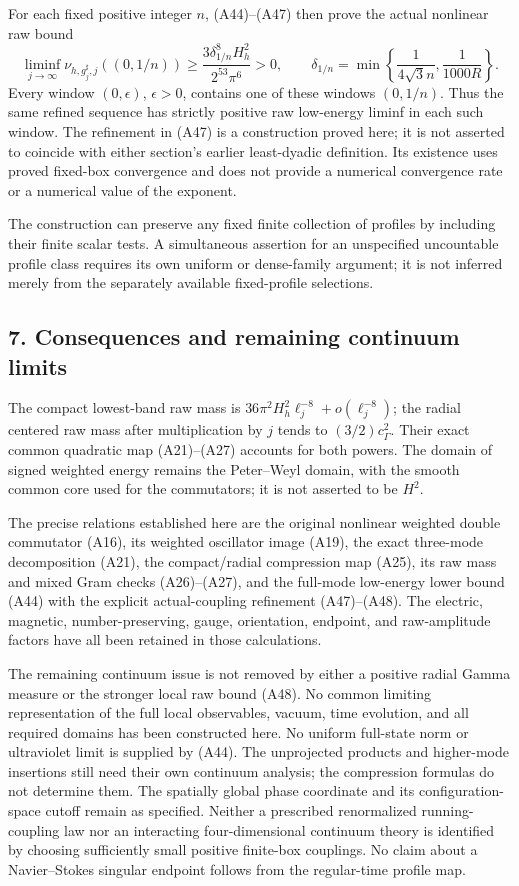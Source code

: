 \documentclass[
  11pt,
]{article}
\begin{document}
For each fixed positive integer \(n\), (A44)--(A47) then prove the
actual nonlinear raw bound \[
 \liminf_{j\to\infty}\nu_{h,g_j^{\sharp},j}((0,1/n))
 \ge\frac{3\delta_{1/n}^8H_h^2}{2^{53}\pi^6}>0,
 \qquad
 \delta_{1/n}=\min\left\{\frac1{4\sqrt3n},\frac1{1000R}\right\}.
\tag{A48}
\] Every window \((0,\epsilon)\), \(\epsilon>0\), contains one of these
windows \((0,1/n)\). Thus the same refined sequence has strictly
positive raw low-energy liminf in each such window. The refinement in
(A47) is a construction proved here; it is not asserted to coincide with
either section's earlier least-dyadic definition. Its existence uses
proved fixed-box convergence and does not provide a numerical
convergence rate or a numerical value of the exponent.

The construction can preserve any fixed finite collection of profiles by
including their finite scalar tests. A simultaneous assertion for an
unspecified uncountable profile class requires its own uniform or
dense-family argument; it is not inferred merely from the separately
available fixed-profile selections.

\subsection{7. Consequences and remaining continuum
limits}\label{weak-coupling-part-10-consequences-and-remaining-continuum-limits}

The compact lowest-band raw mass is
\(36\pi^2H_h^2\ell_j^{-8}+o(\ell_j^{-8})\); the radial centered raw mass
after multiplication by \(j\) tends to \((3/2)c_\Gamma^2\). Their exact
common quadratic map (A21)--(A27) accounts for both powers. The domain
of signed weighted energy remains the Peter--Weyl domain, with the
smooth common core used for the commutators; it is not asserted to be
\(H^2\).

The precise relations established here are the original nonlinear
weighted double commutator (A16), its weighted oscillator image (A19),
the exact three-mode decomposition (A21), the compact/radial compression
map (A25), its raw mass and mixed Gram checks (A26)--(A27), and the
full-mode low-energy lower bound (A44) with the explicit actual-coupling
refinement (A47)--(A48). The electric, magnetic, number-preserving,
gauge, orientation, endpoint, and raw-amplitude factors have all been
retained in those calculations.

The remaining continuum issue is not removed by either a positive radial
Gamma measure or the stronger local raw bound (A48). No common limiting
representation of the full local observables, vacuum, time evolution,
and all required domains has been constructed here. No uniform
full-state norm or ultraviolet limit is supplied by (A44). The
unprojected products and higher-mode insertions still need their own
continuum analysis; the compression formulas do not determine them. The
spatially global phase coordinate and its configuration-space cutoff
remain as specified. Neither a prescribed renormalized running-coupling
law nor an interacting four-dimensional continuum theory is identified
by choosing sufficiently small positive finite-box couplings. No claim
about a Navier--Stokes singular endpoint follows from the regular-time
profile map.
\end{document}
